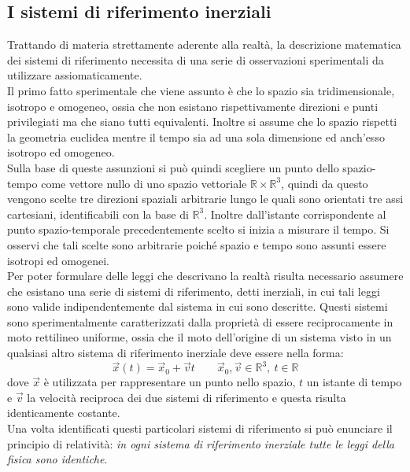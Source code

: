 \subsection{I sistemi di riferimento inerziali}
Trattando di materia strettamente aderente alla realtà, la descrizione matematica dei sistemi di riferimento necessita di una serie di osservazioni sperimentali da utilizzare assiomaticamente.\\

Il primo fatto sperimentale che viene assunto è che lo spazio sia tridimensionale, isotropo e omogeneo, ossia che non esistano rispettivamente direzioni e punti privilegiati ma che siano tutti equivalenti. Inoltre si assume che lo spazio rispetti la 
geometria euclidea mentre il tempo sia ad una sola dimensione ed anch'esso isotropo ed omogeneo.\\
Sulla base di queste assunzioni si può quindi scegliere un punto dello spazio-tempo come 
vettore nullo di uno spazio vettoriale 
$\mathbb{R}\times\mathbb{R}^3$, quindi da questo vengono scelte tre direzioni spaziali arbitrarie lungo le quali sono orientati tre assi cartesiani, identificabili con la base di $\mathbb{R}^3$. 
Inoltre dall'istante corrispondente al punto spazio-temporale precedentemente scelto si inizia a misurare il tempo. Si osservi che tali scelte sono arbitrarie poiché spazio e tempo sono assunti essere isotropi ed omogenei.\\

Per poter formulare delle leggi che descrivano la realtà risulta necessario assumere che esistano una serie di sistemi di riferimento, detti inerziali, in cui tali leggi sono valide indipendentemente dal sistema in cui sono descritte. Questi sistemi sono sperimentalmente caratterizzati dalla proprietà di essere reciprocamente in moto rettilineo uniforme, ossia che il moto dell'origine di un sistema visto in un qualsiasi altro sistema di riferimento inerziale deve essere nella forma: 
\begin{equation}
	\vec x(t)=\vec x_0+\vec vt \qquad \vec x_0,\vec v\in \mathbb{R}^3, \ t\in\mathbb{R}
\end{equation}
dove $\vec x$ è utilizzata per rappresentare un punto nello spazio, $t$ un istante di tempo e $\vec v$ la velocità reciproca dei due sistemi di riferimento e questa risulta identicamente costante.\\

Una volta identificati questi particolari sistemi di riferimento si può enunciare il principio di relatività: \emph{in ogni sistema di riferimento inerziale tutte le leggi della fisica sono identiche}.\\

